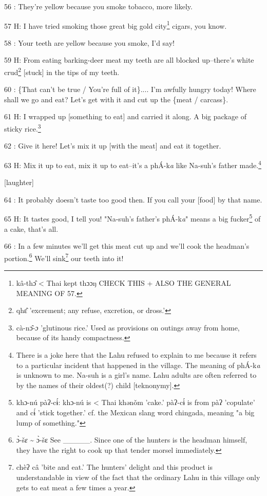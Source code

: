 56  : They're yellow because you smoke tobacco, more likely.

57 H: I have tried smoking those great big gold city\footnote{kâ-thɔ̂ < Thai kept thɔɔŋ CHECK THIS + ALSO THE GENERAL MEANING OF 57.} cigars, you know.

58  : Your teeth are yellow because you smoke, I'd say!

59 H: From eating barking-deer meat my teeth are all blocked up--there's white
crud\footnote{qhɛ̂ 'excrement; any refuse, excretion, or dross.'} [stuck] in the tips of my teeth.

60  : \{That can't be true / You're full of it\}.... I'm awfully hungry today!
Where shall we go and eat? Let's get with it and cut up the \{meat / carcass\}.

61 H: I wrapped up [something to eat] and carried it along. A big package of sticky
rice.\footnote{cà-nɔ̂-\emph{ɔ} 'glutinous rice.' Used as provisions on outings away from home, because of its handy compactness.}

62  : Give it here! Let's mix it up [with the meat] and eat it together.

63 H: Mix it up to eat, mix it up to eat--it's a phÁ-k\emph{a} like Na-suh's father
made.\footnote{There is a joke here that the Lahu refused to explain to me because it refers to a particular incident that happened in the village. The meaning of phÁ-k\emph{a} is unknown to me. Na-suh is a girl's name. Lahu adults are often referred to by the names of their oldest(?) child [teknonymy].}

[laughter]

64  : It probably doesn't taste too good then. If you call your [food] by that
name.

65 H: It tastes good, I tell you! "Na-suh's father's phÁ-k\emph{a}"
means a big fucker\footnote{khɔ-nú pàʔ-cɨ́: khɔ-nú is < Thai khənǒm 'cake.' pàʔ-cɨ́ is from pàʔ 'copulate' and cɨ́ 'stick together.' cf. the Mexican slang word chingada, meaning "a big lump of something."} of a cake, that's all.

66  : In a few minutes we'll get this meat cut up and we'll cook the headman's
portion.\footnote{ɔ̀-š\emph{ɛ} \textasciitilde{} ɔ̀-šɛ See \_\_\_\_\_. Since one of the hunters is the headman himself, they have the right to cook up that tender morsel immediately.} We'll sink\footnote{chèʔ câ 'bite and eat.' The hunters' delight and this product is understandable in view of the fact that the ordinary Lahu in this village only gets to eat meat a few times a year.} our teeth into it!

